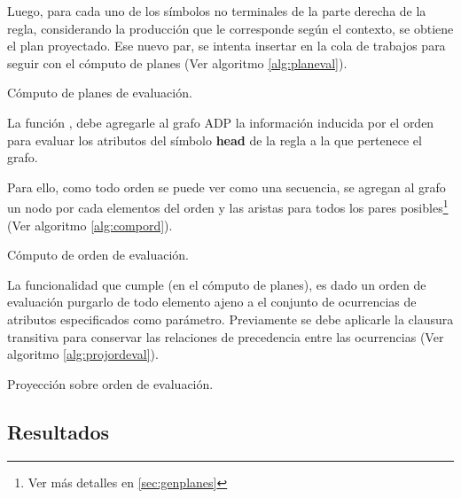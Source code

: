 Luego, para cada uno de los símbolos no terminales de la parte derecha de la regla, considerando la producción que le corresponde según el contexto, se obtiene el plan proyectado. Ese nuevo par, se intenta insertar en la cola de trabajos para seguir con el cómputo de planes (Ver algoritmo \ref{alg:planeval}).

\begin{algorithm}[!ht]

\vspace{-0.5cm}
\caption{\label{alg:planeval}Cómputo de planes de evaluación.}
\end{algorithm}

La función , debe agregarle al grafo ADP la información inducida por el orden para evaluar los atributos del símbolo \textbf{head} de la regla a la que pertenece el grafo.

Para ello, como todo orden se puede ver como una secuencia, se agregan al grafo un nodo por cada elementos del orden y las aristas para todos los pares posibles\footnote{Ver más detalles en \ref{sec:genplanes}} (Ver algoritmo \ref{alg:compord}).

\begin{algorithm}[!ht]

\vspace{-0.5cm}
\caption{\label{alg:compord}Cómputo de orden de evaluación.}
\end{algorithm}

La funcionalidad que cumple  (en el cómputo de planes), es dado un orden de evaluación purgarlo de todo elemento ajeno a el conjunto de ocurrencias de atributos especificados como parámetro. Previamente se debe aplicarle la clausura transitiva para conservar las relaciones de precedencia entre las ocurrencias (Ver algoritmo \ref{alg:projordeval}).

\begin{algorithm}[!ht]

\vspace{-0.5cm}
\caption{\label{alg:projordeval}Proyección sobre orden de evaluación.}
\end{algorithm}

\subsection*{Resultados}

